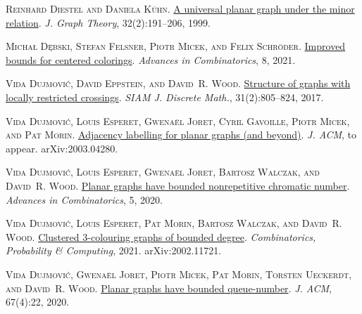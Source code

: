 \documentclass[a4paper,11pt]{article}
\theoremstyle{plain}
\theoremstyle{definition}
\begin{document}
\textsc{Reinhard Diestel and Daniela K\"{u}hn}.
\newblock
  \href{https://doi.org/10.1002/(SICI)1097-0118(199910)32:2<191::AID-JGT8>3.3.CO;2-9}{A
  universal planar graph under the minor relation}.
\newblock \emph{J. Graph Theory}, 32(2):191--206, 1999.

\textsc{Micha{\l} D\k{e}bski, Stefan Felsner, Piotr Micek, and Felix
  Schr\"{o}der}.
\newblock \href{https://doi.org/10.19086/aic.27351}{Improved bounds for
  centered colorings}.
\newblock \emph{Advances in Combinatorics}, 8, 2021.

\textsc{Vida Dujmovi\'c, David Eppstein, and David~R. Wood}.
\newblock \href{https://doi.org/10.1137/16M1062879}{Structure of graphs with
  locally restricted crossings}.
\newblock \emph{SIAM J. Discrete Math.}, 31(2):805--824, 2017.

\textsc{Vida Dujmovi\'c, Louis Esperet, Gwena\"el Joret, Cyril Gavoille, Piotr
  Micek, and Pat Morin}.
\newblock \href{http://arxiv.org/abs/2003.04280}{Adjacency labelling for planar
  graphs (and beyond)}.
\newblock \emph{J. ACM}, to appear.
\newblock arXiv:2003.04280.

\textsc{Vida Dujmovi{\'c}, Louis Esperet, Gwena\"{e}l Joret, Bartosz Walczak,
  and David~R. Wood}.
\newblock \href{https://doi.org/10.19086/aic.12100}{Planar graphs have bounded
  nonrepetitive chromatic number}.
\newblock \emph{Advances in Combinatorics}, 5, 2020{}.

\textsc{Vida Dujmovi{\'c}, Louis Esperet, Pat Morin, Bartosz Walczak, and
  David~R. Wood}.
\newblock \href{https://doi.org/10.1017/S0963548321000213}{Clustered
  3-colouring graphs of bounded degree}.
\newblock \emph{Combinatorics, Probability \& Computing}, 2021.
\newblock arXiv:2002.11721.

\textsc{Vida Dujmovi{\'c}, Gwena\"{e}l Joret, Piotr Micek, Pat Morin, Torsten
  Ueckerdt, and David~R. Wood}.
\newblock \href{https://doi.org/10.1145/3385731}{Planar graphs have bounded
  queue-number}.
\newblock \emph{J. ACM}, 67(4):22, 2020{}.
\end{document}
